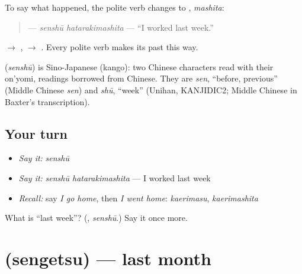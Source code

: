 To say what happened, the polite verb changes \textbf{} to \textbf{}, \emph{mashita}:

\begin{quote}
\textbf{ } — \emph{senshū hatarakimashita} — \textquotedblleft{}I worked last week.\textquotedblright{}
\end{quote}

\textbf{} $\to$ \textbf{}, \textbf{} $\to$ \textbf{}. Every polite verb makes its past this way.

\begin{cousinweb}
\textbf{} (\emph{senshū}) is Sino-Japanese (kango): two Chinese characters read with their on'yomi, readings borrowed from Chinese. They are \emph{sen}, \textquotedblleft{}before, previous\textquotedblright{} (Middle Chinese \emph{sen}) and \emph{shū}, \textquotedblleft{}week\textquotedblright{} (Unihan, KANJIDIC2; Middle Chinese in Baxter's transcription).
\end{cousinweb}

\subsection*{Your turn}
\begin{itemize}
\raggedright
  \item \emph{Say it:} \emph{senshū}
  \item \emph{Say it:} \emph{senshū hatarakimashita} — I worked last week
  \item \emph{Recall:} say \emph{I go home}, then \emph{I went home}: \emph{kaerimasu}, \emph{kaerimashita}
\end{itemize}

\begin{tcolorbox}[breakable,colback=teal!4,colframe=teal!35!black,title={Before you move on}]
What is \textquotedblleft{}last week\textquotedblright{}? (\textbf{}, \emph{senshū}.) Say it once more.
\end{tcolorbox}
\section[\texorpdfstring{\ja{せんげつ} (sengetsu)}{せんげつ (sengetsu)}]{ (sengetsu) — last month}

\label{lesson:JA-C140-sengetsu}




